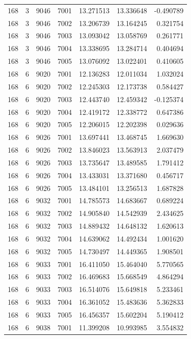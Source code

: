 \begin{table}
\begin{tabular}{rrrrrrr}
168 & 3 & 9046 & 7001 & 13.271513 & 13.336648 & -0.490789 \\
168 & 3 & 9046 & 7002 & 13.206739 & 13.164245 & 0.321754 \\
168 & 3 & 9046 & 7003 & 13.093042 & 13.058769 & 0.261771 \\
168 & 3 & 9046 & 7004 & 13.338695 & 13.284714 & 0.404694 \\
168 & 3 & 9046 & 7005 & 13.076092 & 13.022401 & 0.410605 \\
168 & 6 & 9020 & 7001 & 12.136283 & 12.011034 & 1.032024 \\
168 & 6 & 9020 & 7002 & 12.245303 & 12.173738 & 0.584427 \\
168 & 6 & 9020 & 7003 & 12.443740 & 12.459342 & -0.125374 \\
168 & 6 & 9020 & 7004 & 12.419172 & 12.338772 & 0.647386 \\
168 & 6 & 9020 & 7005 & 12.206015 & 12.202398 & 0.029636 \\
168 & 6 & 9026 & 7001 & 13.697441 & 13.468745 & 1.669630 \\
168 & 6 & 9026 & 7002 & 13.846023 & 13.563913 & 2.037479 \\
168 & 6 & 9026 & 7003 & 13.735647 & 13.489585 & 1.791412 \\
168 & 6 & 9026 & 7004 & 13.433031 & 13.371680 & 0.456717 \\
168 & 6 & 9026 & 7005 & 13.484101 & 13.256513 & 1.687828 \\
168 & 6 & 9032 & 7001 & 14.785573 & 14.683667 & 0.689224 \\
168 & 6 & 9032 & 7002 & 14.905840 & 14.542939 & 2.434625 \\
168 & 6 & 9032 & 7003 & 14.889432 & 14.648132 & 1.620613 \\
168 & 6 & 9032 & 7004 & 14.639062 & 14.492434 & 1.001620 \\
168 & 6 & 9032 & 7005 & 14.730497 & 14.449365 & 1.908501 \\
168 & 6 & 9033 & 7001 & 16.411050 & 15.464040 & 5.770565 \\
168 & 6 & 9033 & 7002 & 16.469683 & 15.668549 & 4.864294 \\
168 & 6 & 9033 & 7003 & 16.514076 & 15.649818 & 5.233461 \\
168 & 6 & 9033 & 7004 & 16.361052 & 15.483636 & 5.362833 \\
168 & 6 & 9033 & 7005 & 16.456357 & 15.602204 & 5.190412 \\
168 & 6 & 9038 & 7001 & 11.399208 & 10.993985 & 3.554832 \\

\end{tabular}
\end{table}
